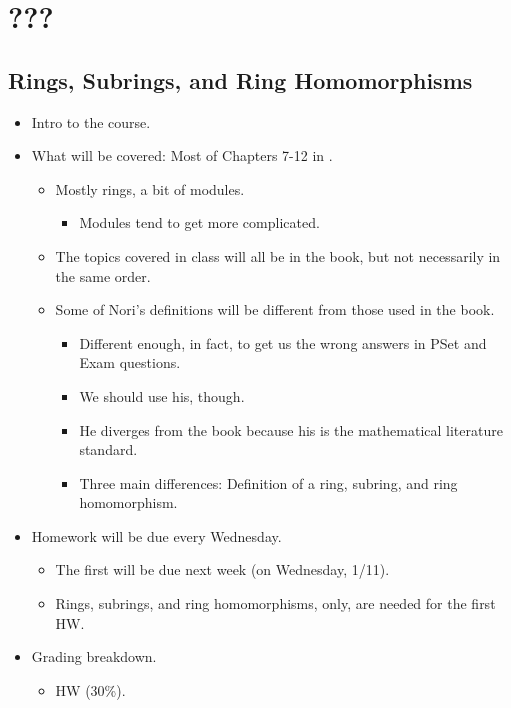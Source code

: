 \documentclass[../notes.tex]{subfiles}
\begin{document}
\chapter{???}
\section{Rings, Subrings, and Ring Homomorphisms}
\begin{itemize}
    \item {}Intro to the course.
    \item What will be covered: Most of Chapters 7-12 in \textcite{bib:DummitFoote}.
    \begin{itemize}
        \item Mostly rings, a bit of modules.
        \begin{itemize}
            \item Modules tend to get more complicated.
        \end{itemize}
        \item The topics covered in class will all be in the book, but not necessarily in the same order.
        \item Some of Nori's definitions will be different from those used in the book.
        \begin{itemize}
            \item Different enough, in fact, to get us the wrong answers in PSet and Exam questions.
            \item We should use his, though.
            \item He diverges from the book because his is the mathematical literature standard.
            \item Three main differences: Definition of a ring, subring, and ring homomorphism.
        \end{itemize}
    \end{itemize}
    \item Homework will be due every Wednesday.
    \begin{itemize}
        \item The first will be due next week (on Wednesday, 1/11).
        \item Rings, subrings, and ring homomorphisms, only, are needed for the first HW.
    \end{itemize}
    \item Grading breakdown.
    \begin{itemize}
        \item HW (30\%).

\end{itemize}
\end{itemize}
\end{document}

